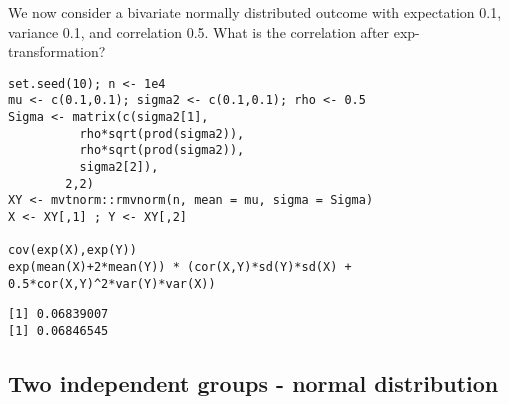 \documentclass[12pt]{article}
\begin{document}
\clearpage

We now consider a bivariate normally distributed outcome with
expectation 0.1, variance 0.1, and correlation 0.5. What is the
correlation after exp-transformation?
\lstset{language=r,label= ,caption= ,captionpos=b,numbers=none}
\begin{lstlisting}
set.seed(10); n <- 1e4
mu <- c(0.1,0.1); sigma2 <- c(0.1,0.1); rho <- 0.5
Sigma <- matrix(c(sigma2[1],
		  rho*sqrt(prod(sigma2)),
		  rho*sqrt(prod(sigma2)),
		  sigma2[2]),
		2,2)
XY <- mvtnorm::rmvnorm(n, mean = mu, sigma = Sigma)
X <- XY[,1] ; Y <- XY[,2]

cov(exp(X),exp(Y))
exp(mean(X)+2*mean(Y)) * (cor(X,Y)*sd(Y)*sd(X) + 0.5*cor(X,Y)^2*var(Y)*var(X))
\end{lstlisting}

\begin{verbatim}
[1] 0.06839007
[1] 0.06846545
\end{verbatim}


\clearpage

\subsection{Two independent groups - normal distribution}
\label{sec:orga866718}
\end{document}
